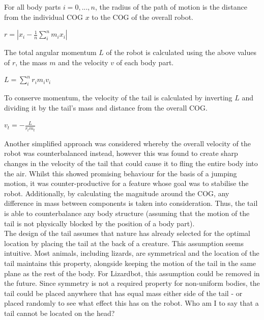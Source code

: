 \documentclass{article}
\begin{document}
For all body parts $i = 0, ..., n$, the radius of the path of motion is the distance from the individual COG $x$ to the COG of the overall robot.
\begin{center}
\begin{Large}
$r = |x_{i} - \frac{1}{n}\sum_{i}^{n}m_{i}x_{i}|$
\end{Large}
\end{center}
The total angular momentum $L$ of the robot is calculated using the above values of $r$, the mass $m$ and the velocity $v$ of each body part. 
\begin{center}
\begin{Large}
$L = \sum^{n}_{i} r_{i}m_{i}v_{i}$
\end{Large}
\end{center}
To conserve momentum, the velocity of the tail is calculated by inverting $L$ and dividing it by the tail's mass and distance from the overall COG.
\begin{center}
\begin{Large}
$v_{t} = - \frac{L}{r_{t}m_{t}}$\\
\end{Large}
\end{center}

Another simplified approach was considered whereby the overall velocity of the robot was counterbalanced instead, however this was found to create sharp changes in the velocity of the tail that could cause it to fling the entire body into the air. Whilst this showed promising behaviour for the basis of a jumping motion, it was counter-productive for a feature whose goal was to stabilise the robot. Additionally, by calculating the magnitude around the COG, any difference in mass between components is taken into consideration. Thus, the tail is able to counterbalance any body structure (assuming that the motion of the tail is not physically blocked by the position of a body part).\\

The design of the tail assumes that nature has already selected for the optimal location by placing the tail at the back of a creature. This assumption seems intuitive. Most animals, including lizards, are symmetrical and the location of the tail maintains this property, alongside keeping the motion of the tail in the same plane as the rest of the body. For Lizardbot, this assumption could be removed in the future. Since symmetry is not a required property for non-uniform bodies, the tail could be placed anywhere that has equal mass either side of the tail - or placed randomly to see what effect this has on the robot. Who am I to say that a tail cannot be located on the head?
\end{document}
